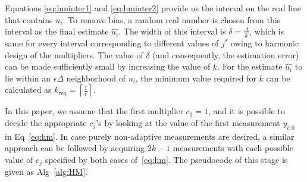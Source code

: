 Equations \eqref{eq:hminter1} and \eqref{eq:hminter2} provide us the interval on the real line that contains $u_i$. To remove bias, a random real number is chosen from this interval as the final estimate $\widehat{u_i}$. The width of this interval is $\delta = \frac{\Delta}{k}$, which is same for every interval corresponding to different values of $j^*$ owing to harmonic design of the multipliers. The value of $\delta$ (and consequently, the estimation error) can be made sufficiently small by increasing the value of $k$. For the estimate $\widehat{u_i}$ to lie within an $\epsilon \Delta$ neighborhood of $u_i$, the minimum value required for $k$ can be calculated as 
$k_{\text{req}} = \left \lceil{\frac{1}{\epsilon}}\right \rceil$.


In this paper, we assume that the first multiplier $c_0 =1$, and it is possible to decide the appropriate $c_j$'s by looking at the value of the first measurement $y_{i,0}$ in Eq\ \eqref{eq:hm}. 
In case purely non-adaptive measurements are desired, a similar approach can be followed by acquiring $2k-1$ measurements with each possible value of $c_j$ specified by both cases of~\eqref{eq:hm}. The pseudocode of this stage is given as Alg~\ref{alg:HM}.

\vspace{-1.2em}%
